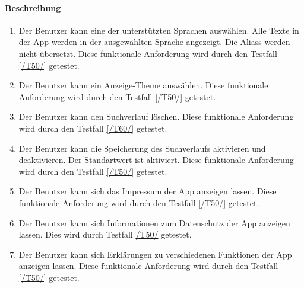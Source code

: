 \paragraph{Beschreibung}
\begin{enumerate}[start=51, label=\textbf{/FA\arabic*/}, align=left]
    \item \label{/FA51/} Der \Gls{Benutzer} kann eine der unterstützten Sprachen auswählen. Alle Texte in der App werden in der ausgewählten Sprache angezeigt. Die \Glspl{Alias} werden nicht übersetzt. Diese funktionale Anforderung wird durch den Testfall \ref{/T50/} getestet.
    \item \label{/FA52/} Der \Gls{Benutzer} kann ein Anzeige-\Gls{Theme} auswählen. Diese funktionale Anforderung wird durch den Testfall \ref{/T50/} getestet.
    \item \label{/FA53/} Der \Gls{Benutzer} kann den \Gls{Suchverlauf} löschen. Diese funktionale Anforderung wird durch den Testfall \ref{/T60/} getestet.
    \item \label{/FA54/} Der \Gls{Benutzer} kann die Speicherung des \Gls{Suchverlauf}s aktivieren und deaktivieren. Der Standartwert ist \dq aktiviert\dq{}. Diese funktionale Anforderung wird durch den Testfall \ref{/T50/} getestet.
    \item \label{/FA55/} Der \Gls{Benutzer} kann sich das Impressum der App anzeigen lassen. Diese funktionale Anforderung wird durch den Testfall \ref{/T50/} getestet.
    \item \label{/FA56/} Der \Gls{Benutzer} kann sich Informationen zum Datenschutz der App anzeigen lassen. Dies wird durch Testfall \hyperref[/T50/]{/T50/} getestet.
    \item \label{/FA57/} Der \Gls{Benutzer} kann sich Erklärungen zu verschiedenen Funktionen der App anzeigen lassen. Diese funktionale Anforderung wird durch den Testfall \ref{/T50/} getestet.
\end{enumerate}